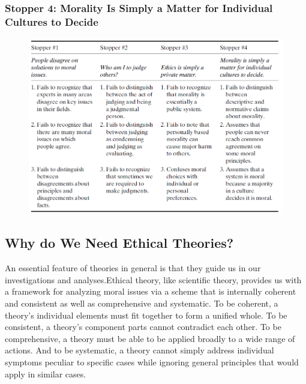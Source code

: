 \documentclass[12pt]{article}
\theoremstyle{definition}
\begin{document}
\subsubsection{Stopper 4: Morality Is Simply a Matter for Individual Cultures to Decide}
\begin{figure}[h]
\centering
\includegraphics[width=\textwidth]{3.png}
\end{figure}
\subsection{Why do We Need Ethical Theories?}
An essential feature of theories in general is that
they guide us in our investigations and analyses.Ethical theory, like
scientific theory, provides us with a framework for analyzing moral issues via a scheme
that is internally coherent and consistent as well as comprehensive and systematic. To
be coherent, a theory’s individual elements must fit together to form a unified whole. To
be consistent, a theory’s component parts cannot contradict each other. To be comprehensive,
a theory must be able to be applied broadly to a wide range of actions. And to be
systematic, a theory cannot simply address individual symptoms peculiar to specific cases
while ignoring general principles that would apply in similar cases.
\end{document}
